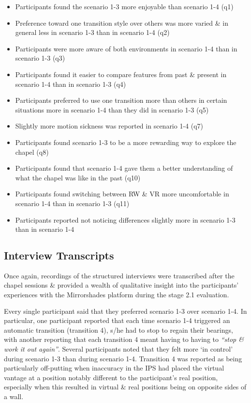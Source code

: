 \begin{itemize}
	\item Participants found the scenario 1-3 more enjoyable than scenario 1-4 (q1)
	\item Preference toward one transition style over others was more varied \& in general less in scenario 1-3 than in scenario 1-4 (q2)
	\item Participants were more aware of both environments in scenario 1-4 than in scenario 1-3 (q3)
	\item Participants found it easier to compare features from past \& present in scenario 1-4 than in scenario 1-3 (q4)
	\item Participants preferred to use one transition more than others in certain situations more in scenario 1-4 than they did in scenario 1-3 (q5)
	\item Slightly more motion sickness was reported in scenario 1-4 (q7)
	\item Participants found scenario 1-3 to be a more rewarding way to explore the chapel (q8)
	\item Participants found that scenario 1-4 gave them a better understanding of what the chapel was like in the past (q10)
	\item Participants found switching between RW \& VR more uncomfortable in scenario 1-4 than in scenario 1-3 (q11)
	\item Participants reported not noticing differences slightly more in scenario 1-3 than in scenario 1-4
\end{itemize}


\subsection{Interview Transcripts}

Once again, recordings of the structured interviews were transcribed after the chapel sessions \& provided a wealth of qualitative insight into the participants' experiences with the Mirrorshades platform during the stage 2.1 evaluation.

Every single participant said that they preferred scenario 1-3 over scenario 1-4. In particular, one participant  reported that each time scenario 1-4 triggered an automatic transition (transition 4), s/he had to stop to regain their bearings, with another reporting that each transition 4 meant having to having to \textit{``stop \& work it out again''}. Several participants noted that they felt more `in control' during scenario 1-3 than during scenario 1-4. Transition 4 was reported as being particularly off-putting when inaccuracy in the IPS had placed the virtual vantage at a position notably different to the participant's real position, especially when this resulted in virtual \& real positions being on opposite sides of a wall.

